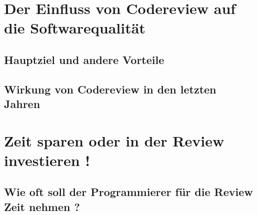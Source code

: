 \section{Der Einfluss von Codereview auf die Softwarequalität}

\subsection{Hauptziel und andere Vorteile}

\subsection{Wirkung von Codereview in den letzten Jahren}



\section{Zeit sparen oder in der Review investieren !}

\subsection{Wie oft soll der Programmierer für die Review Zeit nehmen ?}


